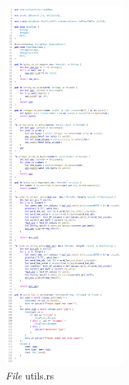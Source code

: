\begin{figure}[H]
  \centering{}
	\includegraphics[width=0.4\textwidth]{gambar/lampiran/file-utils.png}
  \caption{\emph{File} utils.rs}
\end{figure}
